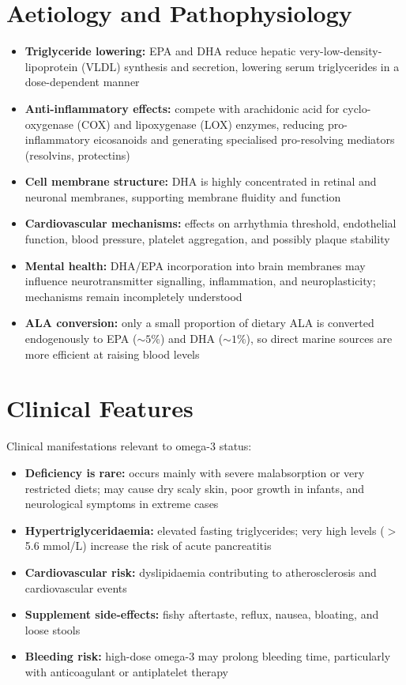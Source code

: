 \section*{Aetiology and Pathophysiology}
\begin{itemize}
    \item \textbf{Triglyceride lowering:} EPA and DHA reduce hepatic very-low-density-lipoprotein (VLDL) synthesis and secretion, lowering serum triglycerides in a dose-dependent manner
    \item \textbf{Anti-inflammatory effects:} compete with arachidonic acid for cyclo-oxygenase (COX) and lipoxygenase (LOX) enzymes, reducing pro-inflammatory eicosanoids and generating specialised pro-resolving mediators (resolvins, protectins)
    \item \textbf{Cell membrane structure:} DHA is highly concentrated in retinal and neuronal membranes, supporting membrane fluidity and function
    \item \textbf{Cardiovascular mechanisms:} effects on arrhythmia threshold, endothelial function, blood pressure, platelet aggregation, and possibly plaque stability
    \item \textbf{Mental health:} DHA/EPA incorporation into brain membranes may influence neurotransmitter signalling, inflammation, and neuroplasticity; mechanisms remain incompletely understood
    \item \textbf{ALA conversion:} only a small proportion of dietary ALA is converted endogenously to EPA ($\sim 5\%$) and DHA ($\sim 1\%$), so direct marine sources are more efficient at raising blood levels
\end{itemize}

\section*{Clinical Features}
Clinical manifestations relevant to omega-3 status:
\begin{itemize}
    \item \textbf{Deficiency is rare:} occurs mainly with severe malabsorption or very restricted diets; may cause dry scaly skin, poor growth in infants, and neurological symptoms in extreme cases
    \item \textbf{Hypertriglyceridaemia:} elevated fasting triglycerides; very high levels ($>$5.6 mmol/L) increase the risk of acute pancreatitis
    \item \textbf{Cardiovascular risk:} dyslipidaemia contributing to atherosclerosis and cardiovascular events
    \item \textbf{Supplement side-effects:} fishy aftertaste, reflux, nausea, bloating, and loose stools
    \item \textbf{Bleeding risk:} high-dose omega-3 may prolong bleeding time, particularly with anticoagulant or antiplatelet therapy
\end{itemize}

